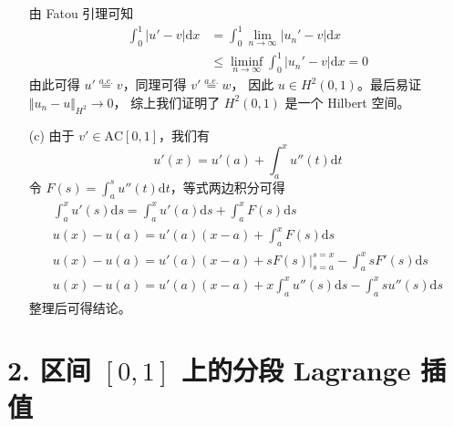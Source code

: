\documentclass[a4paper]{article}
\begin{document}
\begin{enumerate}
\begin{equation}
            \end{equation}
            由 Fatou 引理可知
            \begin{equation}
                \begin{aligned}
                    \int_{0}^{1}|u'-v|\text{d}x
                    &=\int_{0}^{1}\lim_{n\rightarrow \infty}|u_n'-v|\text{d}x\\
                    &\leq \liminf_{n\rightarrow \infty}\int_{0}^{1}|u_n'-v|\text{d}x=0
                \end{aligned}
            \end{equation}
            由此可得 $u' \overset{a.e.}{=} v$，同理可得 $v' \overset{a.e.}{=} w$，
            因此 $u\in H^2(0,1)$。最后易证 $\Vert u_n-u\Vert_{H^2} \rightarrow 0$，
            综上我们证明了 $H^2(0,1)$ 是一个 Hilbert 空间。
    \item[(c)] 由于 $v'\in \text{AC}[0,1]$，我们有
            \begin{equation}
                u'(x) = u'(a) + \int_{a}^{x}u''(t)\text{d}t
            \end{equation}
            令 $F(s)=\int_{a}^{s}u''(t)\text{d}t$，等式两边积分可得
            \begin{gather}
                \int_{a}^{x}u'(s)\text{d}s = \int_{a}^{x}u'(a)\text{d}s + \int_{a}^{x}F(s)\text{d}s\\
                u(x)-u(a) = u'(a)(x-a) + \int_{a}^{x}F(s)\text{d}s\\
                u(x)-u(a) = u'(a)(x-a) + 
                sF(s)\Big|_{s=a}^{s=x} - \int_{a}^{x}sF'(s)\text{d}s\\
                u(x)-u(a) = u'(a)(x-a) + 
                x\int_{a}^{x}u''(s)\text{d}s- \int_{a}^{x}su''(s)\text{d}s
            \end{gather}
            整理后可得结论。
\end{enumerate}

\section*{2. 区间 $[0,1]$ 上的分段 Lagrange 插值}
\end{document}

